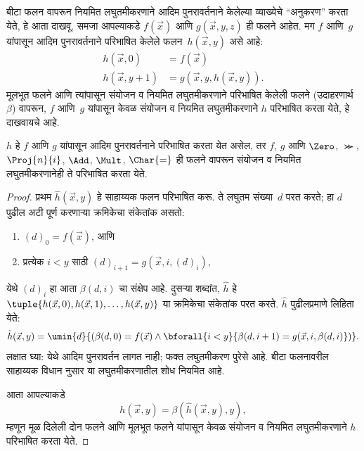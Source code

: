\documentclass[../../../include/open-logic-section]{subfiles}
\begin{document}

बीटा फलन वापरून नियमित लघुतमीकरणाने आदिम पुनरावर्तनाने केलेल्या
व्याख्येचे ``अनुकरण'' करता येते, हे आता दाखवू. समजा आपल्याकडे
$f(\vec x)$ आणि $g(\vec x, y, z)$ ही फलने आहेत. मग $f$ आणि~$g$
यांपासून आदिम पुनरावर्तनाने परिभाषित केलेले फलन~$h(\vec x,y)$
असे आहे:
\begin{align*}
h(\vec x, 0) & =  f(\vec x) \\
h(\vec x, y+1) & =  g(\vec x, y, h(\vec x, y)).
\end{align*}
मूलभूत फलने आणि त्यांपासून संयोजन व नियमित लघुतमीकरणाने
परिभाषित केलेली फलने (उदाहरणार्थ~$\beta$) वापरून,
$f$ आणि~$g$ यांपासून केवळ संयोजन व नियमित लघुतमीकरणाने
$h$ परिभाषित करता येते, हे दाखवायचे आहे.

\begin{lem}
$h$ हे $f$ आणि $g$ यांपासून आदिम पुनरावर्तनाने परिभाषित
करता येत असेल, तर $f$, $g$ आणि $\Zero$, $\Succ$,
$\Proj{n}{i}$, $\Add$, $\Mult$, $\Char{=}$ ही फलने
वापरून संयोजन व नियमित लघुतमीकरणानेही ते परिभाषित करता येते.
\end{lem}

\begin{proof}
प्रथम $\hat h(\vec x, y)$ हे साहाय्यक फलन परिभाषित करू.
ते लघुतम संख्या~$d$ परत करते; हा $d$ पुढील अटी
पूर्ण करणाऱ्या क्रमिकेचा संकेतांक असतो:
\begin{enumerate}
\item $(d)_0 = f(\vec x)$, आणि
\item प्रत्येक $i < y$ साठी $(d)_{i+1} = g(\vec x, i, (d)_i)$,
\end{enumerate}
येथे $(d)_i$ हा आता $\beta(d,i)$ चा संक्षेप आहे. दुसऱ्या
शब्दांत, $\hat h$ हे $\tuple{h(\vec x, 0), h(\vec x, 1),
\dots, h(\vec x, y)}$ या क्रमिकेचा संकेतांक परत करते.
$\hat h$ पुढीलप्रमाणे लिहिता येते:
\[
\hat h(\vec x, y) = \umin{d}{(\beta(d,0) = f(\vec x) \land \bforall{i <
  y}{\beta(d,i+1) = g(\vec x, i,\beta(d,i)})}.
\]
लक्षात घ्या: येथे आदिम पुनरावर्तन लागत नाही; फक्त
लघुतमीकरण पुरेसे आहे. बीटा फलनावरील साहाय्यक विधान
 नुसार या लघुतमीकरणातील शोध नियमित आहे.

आता आपल्याकडे
\[
h(\vec x, y) = \beta(\hat h(\vec x, y), y),
\]
म्हणून मूळ दिलेली दोन फलने आणि मूलभूत फलने यांपासून केवळ संयोजन
व नियमित लघुतमीकरणाने $h$ परिभाषित करता येते.
\end{proof}
\end{document}
